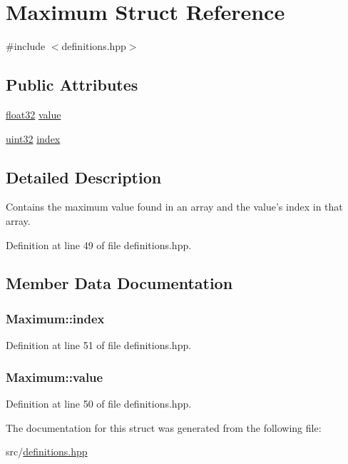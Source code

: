 \hypertarget{structMaximum}{\section{Maximum Struct Reference}
\label{structMaximum}
}


{\ttfamily \#include $<$definitions.\+hpp$>$}

\subsection*{Public Attributes}
\begin{DoxyCompactItemize}
\item 
\hyperlink{definitions_8hpp_aacdc525d6f7bddb3ae95d5c311bd06a1}{float32} \hyperlink{structMaximum_aa7e84cbf37b694670142670014366969}{value}
\item 
\hyperlink{definitions_8hpp_a1134b580f8da4de94ca6b1de4d37975e}{uint32} \hyperlink{structMaximum_a2e6aef03795cd285fe542d0861c6e3b5}{index}
\end{DoxyCompactItemize}


\subsection{Detailed Description}
Contains the maximum value found in an array and the value's index in that array. 

Definition at line 49 of file definitions.\+hpp.



\subsection{Member Data Documentation}
\hypertarget{structMaximum_a2e6aef03795cd285fe542d0861c6e3b5}{
\subsubsection[{index}]{ Maximum\+::index}}\label{structMaximum_a2e6aef03795cd285fe542d0861c6e3b5}


Definition at line 51 of file definitions.\+hpp.

\hypertarget{structMaximum_aa7e84cbf37b694670142670014366969}{
\subsubsection[{value}]{ Maximum\+::value}}\label{structMaximum_aa7e84cbf37b694670142670014366969}


Definition at line 50 of file definitions.\+hpp.



The documentation for this struct was generated from the following file\+:\begin{DoxyCompactItemize}
\item 
src/\hyperlink{definitions_8hpp}{definitions.\+hpp}\end{DoxyCompactItemize}
